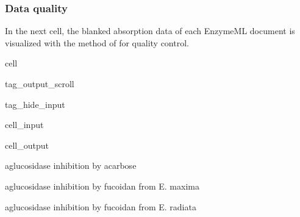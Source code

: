 \documentclass[letterpaper,12pt,english]{jupyterBook}
\begin{document}
\subsubsection{Data quality}
\label{\detokenize{scenarios/glycosidase_inhibition:data-quality}}
\sphinxAtStartPar
In the next cell, the blanked absorption data of each EnzymeML document is visualized with the \sphinxhyphen{}method of  for quality control.

\begin{sphinxuseclass}{cell}
\begin{sphinxuseclass}{tag_output_scroll}
\begin{sphinxuseclass}{tag_hide_input}\begin{sphinxVerbatimInput}

\begin{sphinxuseclass}{cell_input}
\begin{sphinxVerbatim}[commandchars=\\\{\}]
   
\end{sphinxVerbatim}

\end{sphinxuseclass}\end{sphinxVerbatimInput}
\begin{sphinxVerbatimOutput}

\begin{sphinxuseclass}{cell_output}
\begin{sphinxVerbatim}[commandchars=\\\{\}]
a\PYGZhy{}glucosidase inhibition by acarbose
\end{sphinxVerbatim}

\noindent{}

\begin{sphinxVerbatim}[commandchars=\\\{\}]
a\PYGZhy{}glucosidase inhibition by fucoidan from E. maxima
\end{sphinxVerbatim}

\noindent{}

\begin{sphinxVerbatim}[commandchars=\\\{\}]
a\PYGZhy{}glucosidase inhibition by fucoidan from E. radiata
\end{sphinxVerbatim}


\end{sphinxuseclass}
\end{sphinxVerbatimOutput}
\end{sphinxuseclass}
\end{sphinxuseclass}
\end{sphinxuseclass}
\end{document}
